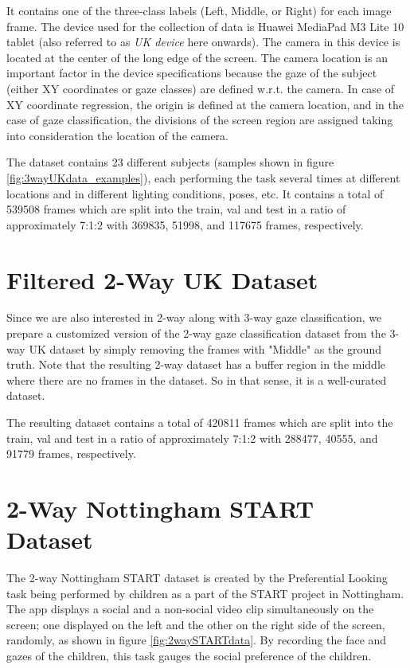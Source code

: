 It contains one of the three-class labels (Left, Middle, or Right) for each image frame. The device used for the collection of data is Huawei MediaPad M3 Lite 10 tablet (also referred to as \emph{UK device} here onwards). The camera in this device is located at the center of the long edge of the screen. The camera location is an important factor in the device specifications because the gaze of the subject (either XY coordinates or gaze classes) are defined w.r.t. the camera. In case of XY coordinate regression, the origin is defined at the camera location, and in the case of gaze classification, the divisions of the screen region are assigned taking into consideration the location of the camera.

The dataset contains 23 different subjects (samples shown in figure \ref{fig:3wayUKdata_examples}), each performing the task several times at different locations and in different lighting conditions, poses, etc. It contains a total of 539508 frames which are split into the train, val and test in a ratio of approximately 7:1:2 with 369835, 51998, and 117675 frames, respectively.


\section{Filtered 2-Way UK Dataset}
Since we are also interested in 2-way along with 3-way gaze classification, we prepare a customized version of the 2-way gaze classification dataset from the 3-way UK dataset by simply removing the frames with "Middle" as the ground truth. Note that the resulting 2-way dataset has a buffer region in the middle where there are no frames in the dataset. So in that sense, it is a well-curated dataset.

The resulting dataset contains a total of 420811 frames which are split into the train, val and test in a ratio of approximately 7:1:2 with 288477, 40555, and 91779 frames, respectively.


\section{2-Way Nottingham START Dataset}
The 2-way Nottingham START dataset is created by the Preferential Looking task being performed by children as a part of the START project in Nottingham. The app displays a social and a non-social video clip simultaneously on the screen; one displayed on the left and the other on the right side of the screen, randomly, as shown in figure \ref{fig:2waySTARTdata}. By recording the face and gazes of the children, this task gauges the social preference of the children.

